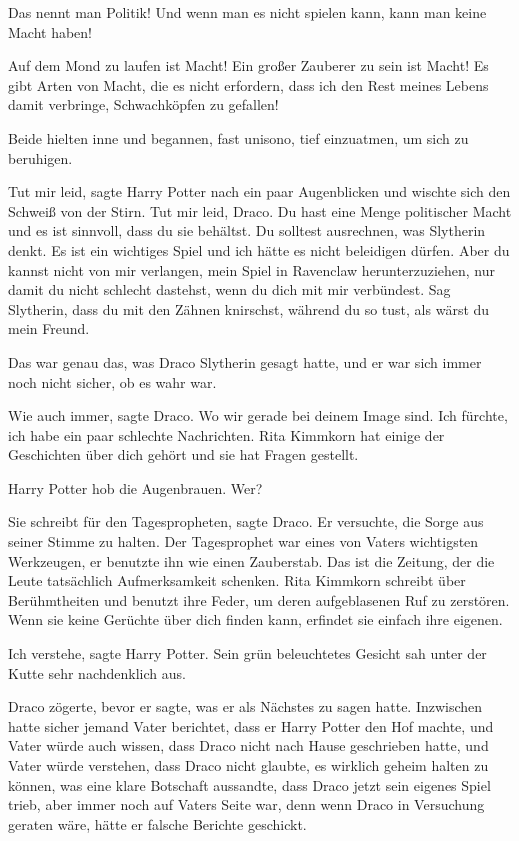 \glqq{}Das nennt man Politik! Und wenn man es nicht spielen kann, kann man keine
Macht haben!\grqq{}

\glqq{}Auf dem Mond zu laufen ist Macht! Ein großer Zauberer zu sein ist Macht!
Es gibt Arten von Macht, die es nicht erfordern, dass ich den Rest meines Lebens
damit verbringe, Schwachköpfen zu gefallen!\grqq{}

Beide hielten inne und begannen, fast unisono, tief einzuatmen, um sich zu
beruhigen.

\glqq{}Tut mir leid\grqq{}, sagte Harry Potter nach ein paar Augenblicken und
wischte sich den Schweiß von der Stirn. \glqq{}Tut mir leid, Draco. Du hast eine
Menge politischer Macht und es ist sinnvoll, dass du sie behältst. Du solltest
ausrechnen, was Slytherin denkt. Es ist ein wichtiges Spiel und ich hätte es
nicht beleidigen dürfen. Aber du kannst nicht von mir verlangen, mein Spiel in
Ravenclaw herunterzuziehen, nur damit du nicht schlecht dastehst, wenn du dich
mit mir verbündest. Sag Slytherin, dass du mit den Zähnen knirschst, während du
so tust, als wärst du mein Freund.\grqq{}

Das war genau das, was Draco Slytherin gesagt hatte, und er war sich immer noch
nicht sicher, ob es wahr war.

\glqq{}Wie auch immer\grqq{}, sagte Draco. \glqq{}Wo wir gerade bei deinem Image
sind. Ich fürchte, ich habe ein paar schlechte Nachrichten. Rita Kimmkorn hat
einige der Geschichten über dich gehört und sie hat Fragen gestellt.\grqq{}

Harry Potter hob die Augenbrauen. \glqq{}Wer?\grqq{}

\glqq{}Sie schreibt für den Tagespropheten\grqq{}, sagte Draco. Er versuchte,
die Sorge aus seiner Stimme zu halten. Der Tagesprophet war eines von Vaters
wichtigsten Werkzeugen, er benutzte ihn wie einen Zauberstab. \glqq{}Das ist die
Zeitung, der die Leute tatsächlich Aufmerksamkeit schenken. Rita Kimmkorn
schreibt über Berühmtheiten und benutzt ihre Feder, um deren aufgeblasenen Ruf
zu zerstören. Wenn sie keine Gerüchte über dich finden kann, erfindet sie
einfach ihre eigenen.\grqq{}

\glqq{}Ich verstehe\grqq{}, sagte Harry Potter. Sein grün beleuchtetes Gesicht
sah unter der Kutte sehr nachdenklich aus.

Draco zögerte, bevor er sagte, was er als Nächstes zu sagen hatte. Inzwischen
hatte sicher jemand Vater berichtet, dass er Harry Potter den Hof machte, und
Vater würde auch wissen, dass Draco nicht nach Hause geschrieben hatte, und
Vater würde verstehen, dass Draco nicht glaubte, es wirklich geheim halten zu
können, was eine klare Botschaft aussandte, dass Draco jetzt sein eigenes Spiel
trieb, aber immer noch auf Vaters Seite war, denn wenn Draco in Versuchung
geraten wäre, hätte er falsche Berichte geschickt.

